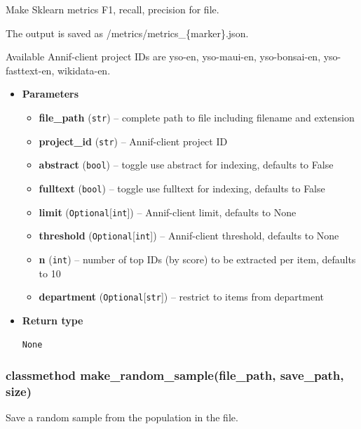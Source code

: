 Make Sklearn metrics F1, recall, precision for file.

The output is saved as /metrics/metrics\_\{marker\}.json.

Available Annif-client project IDs are yso-en, yso-maui-en,
yso-bonsai-en, yso-fasttext-en, wikidata-en.

\begin{itemize}
\item
  \textbf{Parameters}

  \begin{itemize}
  \item
    \textbf{file\_path} (\texttt{str}) -- complete path to file
    including filename and extension
  \item
    \textbf{project\_id} (\texttt{str}) -- Annif-client project ID
  \item
    \textbf{abstract} (\texttt{bool}) -- toggle use abstract for
    indexing, defaults to False
  \item
    \textbf{fulltext} (\texttt{bool}) -- toggle use fulltext for
    indexing, defaults to False
  \item
    \textbf{limit} (\texttt{Optional}{[}\texttt{int}{]}) -- Annif-client
    limit, defaults to None
  \item
    \textbf{threshold} (\texttt{Optional}{[}\texttt{int}{]}) --
    Annif-client threshold, defaults to None
  \item
    \textbf{n} (\texttt{int}) -- number of top IDs (by score) to be
    extracted per item, defaults to 10
  \item
    \textbf{department} (\texttt{Optional}{[}\texttt{str}{]}) --
    restrict to items from department
  \end{itemize}
\item
  \textbf{Return type}

  \texttt{None}
\end{itemize}

\hypertarget{classmethod-make_random_samplefile_path-save_path-size}{%
\subsubsection{classmethod make\_random\_sample(file\_path, save\_path,
size)}\label{classmethod-make_random_samplefile_path-save_path-size}}

Save a random sample from the population in the file.


